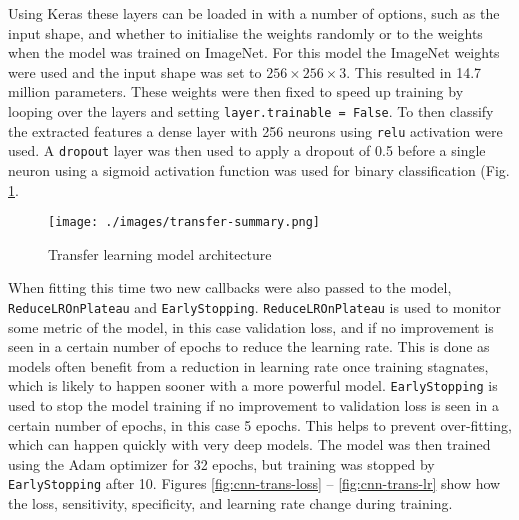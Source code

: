\documentclass[12pt,a4paper,titlepage,twoside]{report}
\begin{document}
	Using Keras these layers can be loaded in with a number of options, such as the input shape, and whether to initialise the weights randomly or to the weights when the model was trained on ImageNet. For this model the ImageNet weights were used and the input shape was set to $256 \times 256 \times 3$. This resulted in 14.7 million parameters. These weights were then fixed to speed up training by looping over the layers and setting \texttt{layer.trainable = False}. To then classify the extracted features a dense layer with 256 neurons using \texttt{relu} activation were used. A \texttt{dropout} layer was then used to apply a dropout of 0.5 before a single neuron using a sigmoid activation function was used for binary classification (Fig. \ref{fig:transfer-summary}.
	
	\begin{figure}[h]
		\centering
		\texttt{[image: ./images/transfer-summary.png]}
		\caption{Transfer learning model architecture}
		\label{fig:transfer-summary}
	\end{figure}
	
	When fitting this time two new callbacks were also passed to the model, \texttt{ReduceLROnPlateau} and \texttt{EarlyStopping}. \texttt{ReduceLROnPlateau} is used to monitor some metric of the model, in this case validation loss, and if no improvement is seen in a certain number of epochs to reduce the learning rate. This is done as models often benefit from a reduction in learning rate once training stagnates, which is likely to happen sooner with a more powerful model. \texttt{EarlyStopping} is used to stop the model training if no improvement to validation loss is seen in a certain number of epochs, in this case 5 epochs. This helps to prevent over-fitting, which can happen quickly with very deep models. The model was then trained using the Adam optimizer for 32 epochs, but training was stopped by \texttt{EarlyStopping} after 10. Figures \ref{fig:cnn-trans-loss} -- \ref{fig:cnn-trans-lr} show how the loss, sensitivity, specificity, and learning rate change during training. \par
	
\end{document}
